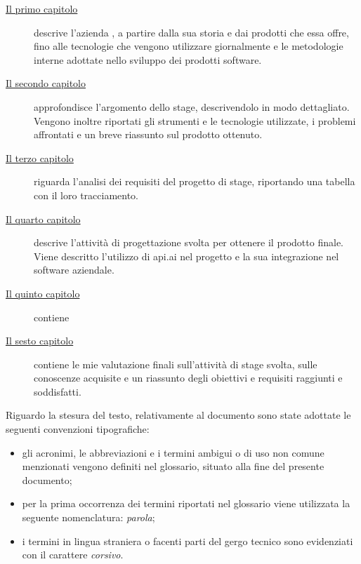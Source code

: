 \begin{description}
    \item[{\hyperref[cap:contesto-aziendale]{Il primo capitolo}}] descrive l'azienda \azienda{}, a partire dalla sua storia e dai prodotti che essa offre, fino alle tecnologie che vengono utilizzare giornalmente e le metodologie interne adottate nello sviluppo dei prodotti software. 
    
    \item[{\hyperref[cap:progetto-stage]{Il secondo capitolo}}] approfondisce l'argomento dello stage, descrivendolo in modo dettagliato. Vengono inoltre riportati gli strumenti e le tecnologie utilizzate, i problemi affrontati e un breve riassunto sul prodotto ottenuto.
    
    \item[{\hyperref[cap:analisi]{Il terzo capitolo}}] riguarda l'analisi dei requisiti del progetto di stage, riportando una tabella con il loro tracciamento.
    
    \item[{\hyperref[cap:progettazione]{Il quarto capitolo}}] descrive l'attività di progettazione svolta per ottenere il prodotto finale. Viene descritto l'utilizzo di api.ai nel progetto e la sua integrazione nel software aziendale.
    
    \item[{\hyperref[cap:verfica]{Il quinto capitolo}}] contiene 
    
    \item[{\hyperref[cap:conclusioni]{Il sesto capitolo}}] contiene le mie valutazione finali sull'attività di stage svolta, sulle conoscenze acquisite e un riassunto degli obiettivi e requisiti raggiunti e soddisfatti.

\end{description}

Riguardo la stesura del testo, relativamente al documento sono state adottate le seguenti convenzioni tipografiche:
\begin{itemize}
	\item gli acronimi, le abbreviazioni e i termini ambigui o di uso non comune menzionati vengono definiti nel glossario, situato alla fine del presente documento;
	\item per la prima occorrenza dei termini riportati 
	nel glossario viene utilizzata la seguente nomenclatura: \emph{parola}\glsfirstoccur{};
	\item i termini in lingua straniera o facenti parti del gergo tecnico sono evidenziati con il carattere \emph{corsivo}.
\end{itemize}